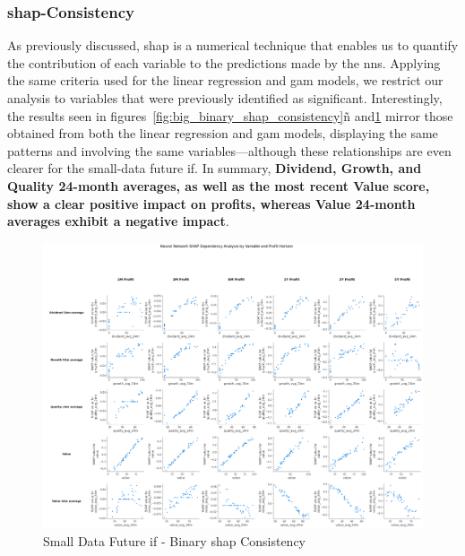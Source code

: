 \documentclass[11pt,english,a4paper,hidelinks]{book}
\begin{document}
\subsubsection{\acrshort{shap}-Consistency}

\noindent As previously discussed, \gls{shap} is a numerical technique that enables us to quantify the contribution of each variable to the predictions made by the \acrshort{nn}s. Applying the same criteria used for the linear regression and \acrshort{gam} models, we restrict our analysis to variables that were previously identified as significant. Interestingly, the results seen in figures~\ref{fig:big_binary_shap_consistency}ñ and\ref{fig:small_binary_shap_consistency} mirror those obtained from both the linear regression and \acrshort{gam} models, displaying the same patterns and involving the same variables—although these relationships are even clearer for the small-data future \acrshort{if}. In summary, \textbf{Dividend, Growth, and Quality 24-month averages, as well as the most recent Value score, show a clear positive impact on profits, whereas Value 24-month averages exhibit a negative impact}.

\begin{figure}[H]
    \centering
    \includegraphics[width=1\textwidth]{images/code/models/neural_network/binary_classifier_nn/Small Test - IF/shap_table_analysis.png}
    \caption{Small Data Future \acrshort{if} - Binary \gls{shap} Consistency}
    \label{fig:small_binary_shap_consistency}
\end{figure}
\end{document}
